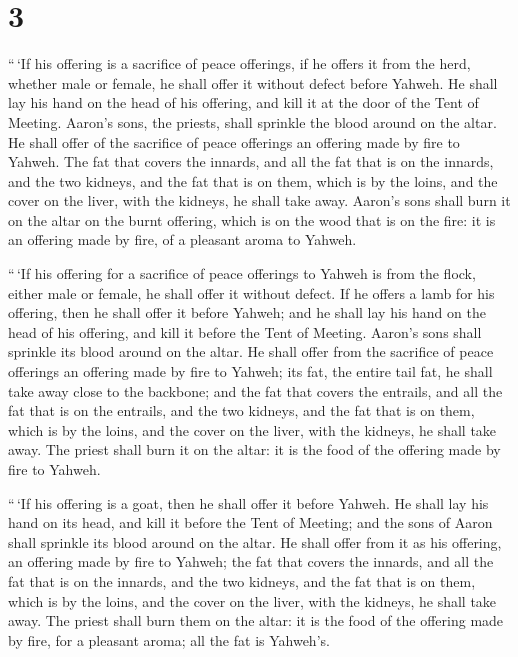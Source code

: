 \hypertarget{section-2}{%
\section{3}\label{section-2}}

 ``\,`If his offering is a sacrifice of peace offerings, if
he offers it from the herd, whether male or female, he shall offer it
without defect before Yahweh.  He shall lay his hand on the
head of his offering, and kill it at the door of the Tent of Meeting.
Aaron's sons, the priests, shall sprinkle the blood around on the altar.
 He shall offer of the sacrifice of peace offerings an
offering made by fire to Yahweh. The fat that covers the innards, and
all the fat that is on the innards,  and the two kidneys,
and the fat that is on them, which is by the loins, and the cover on the
liver, with the kidneys, he shall take away.  Aaron's sons
shall burn it on the altar on the burnt offering, which is on the wood
that is on the fire: it is an offering made by fire, of a pleasant aroma
to Yahweh.

 ``\,`If his offering for a sacrifice of peace offerings to
Yahweh is from the flock, either male or female, he shall offer it
without defect.  If he offers a lamb for his offering, then
he shall offer it before Yahweh;  and he shall lay his hand
on the head of his offering, and kill it before the Tent of Meeting.
Aaron's sons shall sprinkle its blood around on the altar. 
He shall offer from the sacrifice of peace offerings an offering made by
fire to Yahweh; its fat, the entire tail fat, he shall take away close
to the backbone; and the fat that covers the entrails, and all the fat
that is on the entrails,  and the two kidneys, and the fat
that is on them, which is by the loins, and the cover on the liver, with
the kidneys, he shall take away.  The priest shall burn it
on the altar: it is the food of the offering made by fire to Yahweh.

 ``\,`If his offering is a goat, then he shall offer it
before Yahweh.  He shall lay his hand on its head, and kill
it before the Tent of Meeting; and the sons of Aaron shall sprinkle its
blood around on the altar.  He shall offer from it as his
offering, an offering made by fire to Yahweh; the fat that covers the
innards, and all the fat that is on the innards,  and the
two kidneys, and the fat that is on them, which is by the loins, and the
cover on the liver, with the kidneys, he shall take away. 
The priest shall burn them on the altar: it is the food of the offering
made by fire, for a pleasant aroma; all the fat is Yahweh's.

